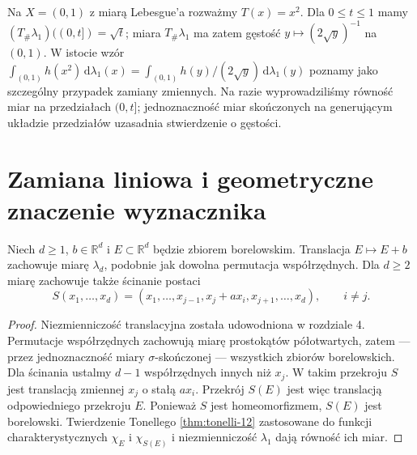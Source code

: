 \begin{przyklad}
Na $X=(0,1)$ z miarą Lebesgue'a rozważmy $T(x)=x^2$.
Dla $0\le t\le1$ mamy
$(T_\#\lambda_1)((0,t])=\sqrt t$; miara $T_\#\lambda_1$
ma zatem gęstość $y\mapsto(2\sqrt y)^{-1}$ na $(0,1)$.
W istocie wzór
$\int_{(0,1)}h(x^2)\,\mathrm d\lambda_1(x)
=\int_{(0,1)}h(y)/(2\sqrt y)\,\mathrm d\lambda_1(y)$
poznamy jako szczególny przypadek zamiany zmiennych.
Na razie wyprowadziliśmy równość miar na przedziałach $(0,t]$;
jednoznaczność miar skończonych na generującym układzie przedziałów
uzasadnia stwierdzenie o gęstości.
\end{przyklad}

\section{Zamiana liniowa i geometryczne znaczenie wyznacznika}

\begin{lemat}
\label{lem:shear-13}
Niech $d\ge1$, $b\in\mathbb R^d$ i $E\subset\mathbb R^d$
będzie zbiorem borelowskim. Translacja $E\mapsto E+b$ zachowuje
miarę $\lambda_d$, podobnie jak dowolna permutacja współrzędnych.
Dla $d\ge2$ miarę zachowuje także ścinanie postaci
\[
S(x_1,\ldots,x_d)=(x_1,\ldots,x_{j-1},
 x_j+a x_i,x_{j+1},\ldots,x_d),\qquad i\ne j.
\]
\end{lemat}
\begin{proof}
Niezmienniczość translacyjna została udowodniona w rozdziale 4.
Permutacje współrzędnych zachowują miarę prostokątów
półotwartych, zatem — przez jednoznaczność miary
$\sigma$-skończonej — wszystkich zbiorów borelowskich.
Dla ścinania ustalmy $d-1$ współrzędnych innych niż $x_j$.
W takim przekroju $S$ jest translacją zmiennej $x_j$
o stałą $a x_i$. Przekrój $S(E)$ jest więc translacją
odpowiedniego przekroju $E$. Ponieważ $S$ jest homeomorfizmem,
$S(E)$ jest borelowski. Twierdzenie Tonellego
\ref{thm:tonelli-12} zastosowane do funkcji charakterystycznych $\chi_E$ i $\chi_{S(E)}$
i niezmienniczość $\lambda_1$ dają równość ich miar.
\end{proof}

